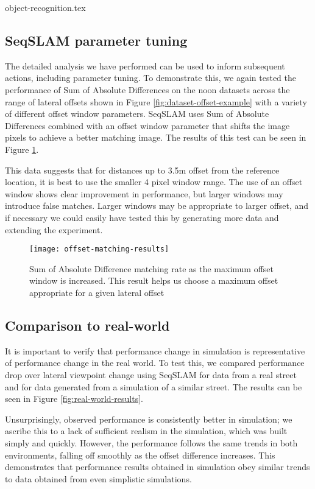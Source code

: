 \documentclass[letterpaper, 10 pt, conference]{ieeeconf}  %
\begin{document}
{object-recognition.tex}

\subsection{SeqSLAM parameter tuning}

The detailed analysis we have performed can be used to inform subsequent actions, including parameter tuning. To demonstrate this, we again tested the performance of Sum of Absolute Differences on the noon datasets across the range of lateral offsets shown in Figure \ref{fig:dataset-offset-example} with a variety of different offset window parameters. SeqSLAM uses Sum of Absolute Differences combined with an offset window parameter that shifts the image pixels to achieve a better matching image. The results of this test can be seen in Figure \ref{fig:offset-matching-param-results}.

This data suggests that for distances up to 3.5m offset from the reference location, it is best to use the smaller 4 pixel window range. The use of an offset window shows clear improvement in performance, but larger windows may  introduce false matches. Larger windows may be appropriate to larger offset, and if necessary we could easily have tested this by generating more data and extending the experiment.

\begin{figure}[t]
    \texttt{[image: offset-matching-results]}
    \caption{Sum of Absolute Difference matching rate as the maximum offset window is increased. This result helps us choose a maximum offset appropriate for a given lateral offset}
    \label{fig:offset-matching-param-results}
\end{figure}

\subsection{Comparison to real-world}

It is important to verify that performance change in simulation is representative of performance change in the real world. To test this, we compared performance drop over lateral viewpoint change using SeqSLAM for data from a real street and for data generated from a simulation of a similar street. The results can be seen in Figure \ref{fig:real-world-results}.

Unsurprisingly, observed performance is consistently better in simulation; we ascribe this to a lack of sufficient realism in the simulation, which was built simply and quickly. However, the performance follows the same trends in both environments, falling off smoothly as the offset difference increases. This demonstrates that performance results obtained in simulation obey similar trends to data obtained from even simplistic simulations.
\end{document}
